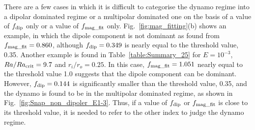 
There are a few cases in which it is difficult to categorise the dynamo regime into a dipolar dominated regime or a multipolar dominated one on the basis of a value of $f_{\rm dip}$ only or a value of $f_{\rm mag\_fit}$ only.
Fig.~\ref{fig:mag_fitting}(b) shows an example, in which the dipole component is not dominant as found from $f_{\rm mag\_fit} = 0.860$, although $f_{\rm dip} = 0.349$ is nearly equal to the threshold value, 0.35.
Another example is found in Table~\ref{table:Summary_25} for $E = 10^{-3}$, $Ra / Ra_{\rm crit} = 9.7$ and $r_i / r_o = 0.25$.
In this case, $f_{\rm mag\_fit} = 1.051$ nearly equal to the threshold value 1.0 suggests that the dipole component can be dominant.
However, $f_{\rm dip} = 0.144$ is significantly smaller than the threshold value, 0.35, and the dynamo is found to be in the multipolar dominated regime, as shown in Fig.~\ref{fig:Snap_non_dipoler_E1-3}.
Thus, if a value of $f_{\rm dip}$ or $f_{\rm mag\_fit}$ is close to its threshold value, it is needed to refer to the other index to judge the dynamo regime.



